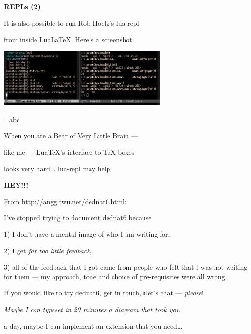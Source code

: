 \documentclass[oneside]{book}
\begin{document}

\newpage


{\bf REPLs (2)}

It is also possible to run Rob Hoelz's lua-repl

from inside Lua\LaTeX. Here's a screenshot.

\includegraphics[width=240pt]{tug-slides-sslr2.png}

=\hbox{abc}
\def\IGNORETHIS{
 (eepitch-shell)
 (eepitch-kill)
 (eepitch-shell)
lualatex tug-slides.tex
print(tex.box[0])
print(tex.box[0].id,             node.id("hlist"))
print(tex.box[0].list)
print(tex.box[0].list.id,        node.id("glyph"))
print(tex.box[0].list.char,      string.byte("a"))
print(tex.box[0].list.next)
print(tex.box[0].list.next.char, string.byte("b"))

}

When you are a Bear of Very Little Brain ---

like me --- Lua\TeX's interface to \TeX{} boxes

looks very hard... lua-repl may help.


\newpage

%                    

{\bf \Large HEY!!!}

From \url{http://angg.twu.net/dednat6.html}:

\msk

I've stopped trying to document dednat6 because

1) I don't have a mental image of who I am writing for,

2) I get {\sl far too little feedback},

3) all of the feedback that I got came from people who felt that I was
not writing for them --- my approach, tone and choice of
pre-requisites were all wrong.

If you would like to try dednat6, get in touch, {𝐫let's chat} --- {\sl
  please}!

\msk

{\sl 
Maybe I can typeset in 20 minutes a diagram that took you

a day, maybe I can implement an extension that you need...
}
\end{document}
